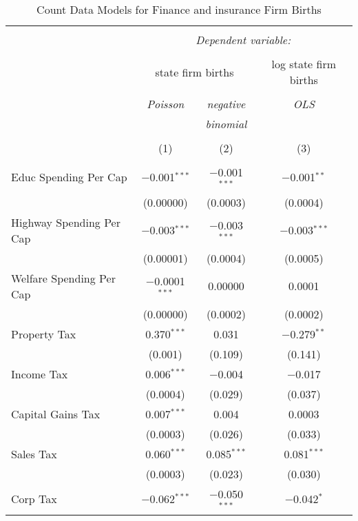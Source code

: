 
\begin{table}[!htbp] \centering 
  \caption{Count Data Models for Finance and insurance Firm Births} 
  \label{} 
\begin{tabular}{@{\extracolsep{5pt}}lccc} 
\\[-1.8ex]\hline 
\hline \\[-1.8ex] 
 & \multicolumn{3}{c}{\textit{Dependent variable:}} \\ 
\cline{2-4} 
\\[-1.8ex] & \multicolumn{2}{c}{state firm births} & log state firm births \\ 
\\[-1.8ex] & \textit{Poisson} & \textit{negative} & \textit{OLS} \\ 
 & \textit{} & \textit{binomial} & \textit{} \\ 
\\[-1.8ex] & (1) & (2) & (3)\\ 
\hline \\[-1.8ex] 
 Educ Spending Per Cap & $-$0.001$^{***}$ & $-$0.001$^{***}$ & $-$0.001$^{**}$ \\ 
  & (0.00000) & (0.0003) & (0.0004) \\ 
  Highway Spending Per Cap  & $-$0.003$^{***}$ & $-$0.003$^{***}$ & $-$0.003$^{***}$ \\ 
  & (0.00001) & (0.0004) & (0.0005) \\ 
  Welfare Spending Per Cap  & $-$0.0001$^{***}$ & 0.00000 & 0.0001 \\ 
  & (0.00000) & (0.0002) & (0.0002) \\ 
  Property Tax & 0.370$^{***}$ & 0.031 & $-$0.279$^{**}$ \\ 
  & (0.001) & (0.109) & (0.141) \\ 
  Income Tax & 0.006$^{***}$ & $-$0.004 & $-$0.017 \\ 
  & (0.0004) & (0.029) & (0.037) \\ 
  Capital Gains Tax & 0.007$^{***}$ & 0.004 & 0.0003 \\ 
  & (0.0003) & (0.026) & (0.033) \\ 
  Sales Tax & 0.060$^{***}$ & 0.085$^{***}$ & 0.081$^{***}$ \\ 
  & (0.0003) & (0.023) & (0.030) \\ 
  Corp Tax & $-$0.062$^{***}$ & $-$0.050$^{***}$ & $-$0.042$^{*}$ \\ 

\end{tabular}
\end{table}
